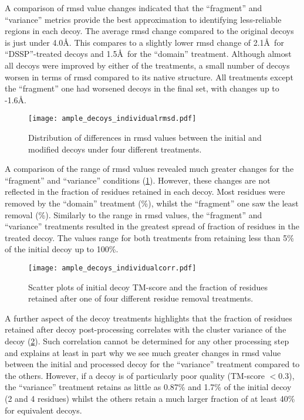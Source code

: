 A comparison of \gls{rmsd} value changes indicated that the ``fragment'' and ``variance'' metrics provide the best approximation to identifying less-reliable regions in each decoy. The average \gls{rmsd} change compared to the original decoys is just under 4.0\AA. This compares to a slightly lower \gls{rmsd} change of 2.1\AA\ for ``DSSP''-treated decoys and 1.5\AA\ for the ``domain'' treatment. Although almost all decoys were improved by either of the treatments, a small number of decoys worsen in terms of \gls{rmsd} compared to its native structure. All treatments except the ``fragment'' one had worsened decoys in the final set, with changes up to -1.6\AA. 

\begin{figure}[H]
	\centering
	\texttt{[image: ample\_decoys\_individualrmsd.pdf]}
        \caption[Difference in RMSD for individually processed decoys]{Distribution of differences in \gls{rmsd} values between the initial and modified decoys under four different treatments.}
	\label{fig:ample_decoys_individualrmsd}
\end{figure}

A comparison of the range of \gls{rmsd} values revealed much greater changes for the ``fragment'' and ``variance'' conditions (\cref{fig:ample_decoys_individualrmsd}). However, these changes are not reflected in the fraction of residues retained in each decoy. Most residues were removed by the ``domain'' treatment (\%), whilst the ``fragment'' one saw the least removal (\%). Similarly to the range in \gls{rmsd} values, the ``fragment'' and ``variance'' treatments resulted in the greatest spread of fraction of residues in the treated decoy. The values range for both treatments from retaining less than 5\% of the initial decoy up to 100\%.

\begin{figure}[H]
        \centering
        \texttt{[image: ample\_decoys\_individualcorr.pdf]}
        \caption[Relationship between decoy quality and fraction of residues retained]{Scatter plots of initial decoy TM-score and the fraction of residues retained after one of four different residue removal treatments.}
        \label{fig:ample_decoys_individualcorr}
\end{figure}

A further aspect of the decoy treatments highlights that the fraction of residues retained after decoy post-processing correlates with the cluster variance of the decoy (\cref{fig:ample_decoys_individualcorr}). Such correlation cannot be determined for any other processing step and explains at least in part why we see much greater changes in \gls{rmsd} value between the initial and processed decoy for the ``variance'' treatment compared to the others. However, if a decoy is of particularly poor quality (TM-score $<0.3$), the ``variance'' treatment retains as little as 0.87\% and 1.7\% of the initial decoy (2 and 4 residues) whilst the others retain a much larger fraction of at least 40\% for equivalent decoys.

